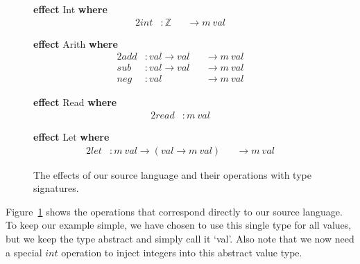 \documentclass[a4paper,UKenglish,cleveref, autoref, thm-restate, anonymous]{oasics-v2021}
\begin{document}
\begin{figure}[ht]
\begin{minipage}[t]{0.4\textwidth}
\textbf{effect} Int \textbf{where}
\vspace{-1em}
\begin{alignat*}{2}
  \mathit{int} & : \mathbb{Z} && \to m~\mathit{val}
\end{alignat*}

\textbf{effect} Arith \textbf{where}
\vspace{-1em}
\begin{alignat*}{2}
  \mathit{add} & : \mathit{val} \to \mathit{val} && \to m~\mathit{val} \\
  \mathit{sub} & : \mathit{val} \to \mathit{val} && \to m~\mathit{val} \\
  \mathit{neg} & : \mathit{val}                  && \to m~\mathit{val}
\end{alignat*}
\end{minipage}%
%
\begin{minipage}[t]{0.6\textwidth}
\textbf{effect} Read \textbf{where}
\vspace{-1em}
\begin{alignat*}{2}
  \mathit{read} & : m~\mathit{val}
\end{alignat*}

\textbf{effect} Let \textbf{where}
\vspace{-1em}
\begin{alignat*}{2}
  \mathit{let} & : m~\mathit{val} \to (\mathit{val} \to m~\mathit{val}) && \to m~\mathit{val}
\end{alignat*}
\end{minipage}
  \caption{The effects of our source language and their operations with type signatures.}\label{fig:source-ops}
\end{figure}

Figure~\ref{fig:source-ops} shows the operations that correspond directly to our source language.
    To keep our example simple, we have chosen to use this single type for all values, but we keep the type abstract and simply call it `val'.
    Also note that we now need a special $\mathit{int}$ operation to inject integers into this abstract value type.
\end{document}
